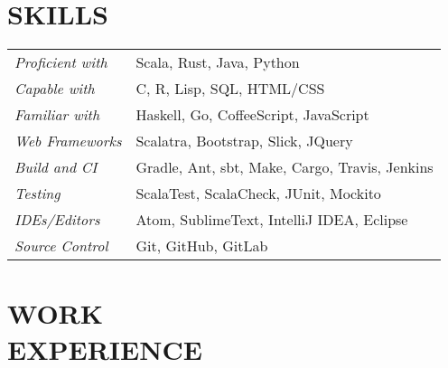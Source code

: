 \documentclass[margin]{res}
\begin{document}
\begin{resume}
\section{SKILLS}
   \begin{tabular}{l p{3in}}
                \textit{Proficient with} & Scala, Rust, Java, Python \\
                \textit{Capable with} & C, R, Lisp, SQL, HTML/CSS \\
                \textit{Familiar with} & Haskell, Go, CoffeeScript, JavaScript \\
                \textit{Web Frameworks}  & Scalatra, Bootstrap, Slick, JQuery \\
                \textit{Build and CI}  & Gradle, Ant, sbt, Make, Cargo, Travis, Jenkins \\
                \textit{Testing}  & ScalaTest, ScalaCheck, JUnit, Mockito\\
                \textit{IDEs/Editors}  &Atom, SublimeText, IntelliJ IDEA, Eclipse \\
                \textit{Source Control} &Git, GitHub, GitLab
 \end{tabular}


\section{WORK \\ EXPERIENCE}



\end{resume}
\end{document}
